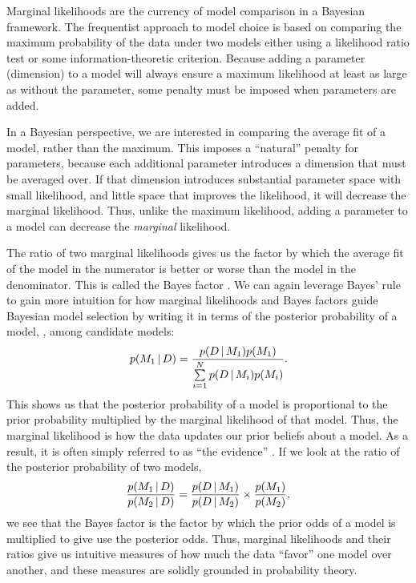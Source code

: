 Marginal likelihoods are the currency of model comparison in a Bayesian
framework. The frequentist approach to model choice is based on comparing
the maximum probability of the data under two models either using
a likelihood ratio test or some information-theoretic criterion.
Because adding a parameter (dimension) to a model will always ensure
a maximum likelihood at least as large as without the parameter, some
penalty must be imposed when parameters are added.

In a Bayesian perspective, we are interested in comparing the average fit of a
model, rather than the maximum.
This imposes a ``natural'' penalty for parameters, because each additional
parameter introduces a dimension that must be averaged over.
If that dimension introduces substantial parameter space with small likelihood,
and little space that improves the likelihood, it will decrease the marginal
likelihood.
Thus, unlike the maximum likelihood, adding a parameter to a model can
decrease the \emph{marginal} likelihood.

\begin{linenomath}
The ratio of two marginal likelihoods gives us the factor by which the
average fit of the model in the numerator is better or worse than the
model in the denominator.
This is called the Bayes factor \citep{Jeffreys1935}.
We can again leverage Bayes' rule to gain more intuition for how marginal
likelihoods and Bayes factors guide Bayesian model selection by
writing it in terms of the posterior probability of a model, \model[1],
among \nmodels candidate models:
\begin{equation}
    p(\model[1] \given \data) = \frac{
        p(\data \given \model[1])
        p(\model[1])
    }{
        \sum\limits_{i=1}^{\nmodels}
        p(\data \given \model[i])
        p(\model[i])
    }.
    \label{eq:bayesRuleModelProbability}
\end{equation}
This shows us that the posterior probability of a model is proportional to the
prior probability multiplied by the marginal likelihood of that model.
Thus, the marginal likelihood is how the data updates our prior beliefs about a
model.
As a result, it is often simply referred to as ``the evidence''
\citep{MacKay2005}.
If we look at the ratio of the posterior probability of two models,
\begin{equation}
    \frac{
        p(\model[1] \given \data)
    }{
        p(\model[2] \given \data)
    }
    =
    \frac{
        p(\data \given \model[1])
    }{
        p(\data \given \model[2])
    }
    \times
    \frac{
        p(\model[1])
    }{
        p(\model[2])
    },
    \label{eq:modelOdds}
\end{equation}
we see that the Bayes factor is the factor by which the prior odds of a model
is multiplied to give use the posterior odds.
Thus, marginal likelihoods and their ratios give us intuitive measures of how
much the data ``favor'' one model over another, and these measures are solidly
grounded in probability theory.
\end{linenomath}

